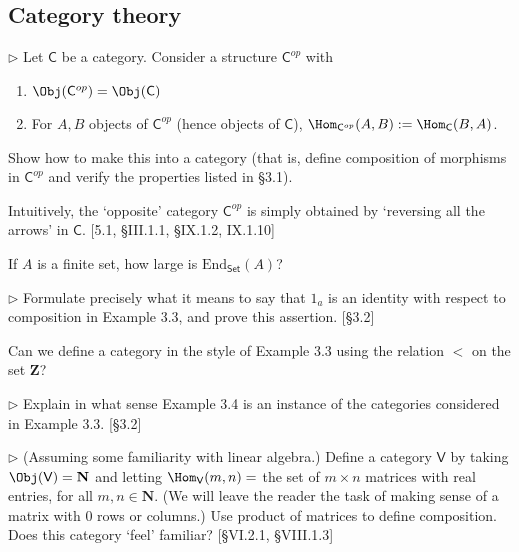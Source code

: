 \subsection{Category theory}


\begin{problem}
  $\rhd$ Let $\mathsf{C}$ be a category. Consider a structure
  $\mathsf{C}^{op}$ with
  \begin{enumerate}
    \item $\Obj(\mathsf{C}^{op}) = \Obj(\mathsf{C})$
    \item For $A, B$ objects of $\mathsf{C}^{op}$ (hence objects of
    $\mathsf{C}$), $\Hom_{\mathsf{C}^{op}}(A, B) := \Hom_{\mathsf{C}}(B, A)$.
  \end{enumerate}
  Show how to make this into a category (that is, define composition of
  morphisms in $\mathsf{C}^{op}$ and verify the properties listed in \S3.1).

  Intuitively, the `opposite' category $\mathsf{C}^{op}$ is simply obtained
  by `reversing all the arrows' in $\mathsf{C}$. [5.1, \S III.1.1, \S IX.1.2,
  IX.1.10]
\end{problem}

\begin{problem}
  If $A$ is a finite set, how large is $\mathrm{End}_{\mathsf{Set}}(A)$?
\end{problem}

\begin{problem}
  $\rhd$ Formulate precisely what it means to say that $1_a$ is an identity
  with respect to composition in Example 3.3, and prove this assertion.
  [\S3.2]
\end{problem}

\begin{problem}
  Can we define a category in the style of Example 3.3 using the relation
  $<$ on the set $\mathbf{Z}$?
\end{problem}

\begin{problem}
  $\rhd$ Explain in what sense Example 3.4 is an instance of the categories
  considered in Example 3.3. [\S 3.2]
\end{problem}

\begin{problem}
  $\rhd$ (Assuming some familiarity with linear algebra.) Define a category
  $\mathsf{V}$ by taking $\Obj(\mathsf{V}) = \mathbf{N}$ and letting
  $\Hom_{\mathsf{V}}(m,n) = $ the set of $m\times n$ matrices with real
  entries, for all $m,n\in\mathbf{N}$. (We will leave the reader the task of
  making sense of a matrix with 0 rows or columns.) Use product of matrices
  to define composition. Does this category `feel' familiar?
  [\S VI.2.1, \S VIII.1.3]
\end{problem}

